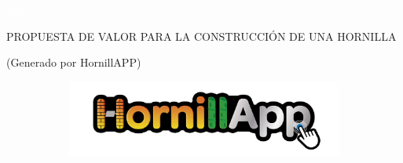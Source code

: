 \documentclass{article}%
\begin{document}
%
\normalsize%
\begin{center}%
\textcolor{white}{ 
HH
}%
\linebreak%
\linebreak%
\linebreak%
\linebreak%
\linebreak%
\linebreak%
\linebreak%
\linebreak%
\linebreak%
\linebreak%
\begin{Huge}%
PROPUESTA DE VALOR PARA LA CONSTRUCCIÓN DE UNA HORNILLA %
\end{Huge}%
\linebreak%
\begin{small}%
(Generado por HornillAPP)%
\end{small}%
\linebreak%
\linebreak%
\linebreak%
\linebreak%
\linebreak%
\linebreak%
\linebreak%
\linebreak%
\end{center}%


\begin{figure}[h!]%
\begin{subfigure}[b]{1\linewidth}%
\includegraphics[width=\linewidth]{IconoAPP.png}%
\end{subfigure}%
\linebreak%
\end{figure}
\end{document}
